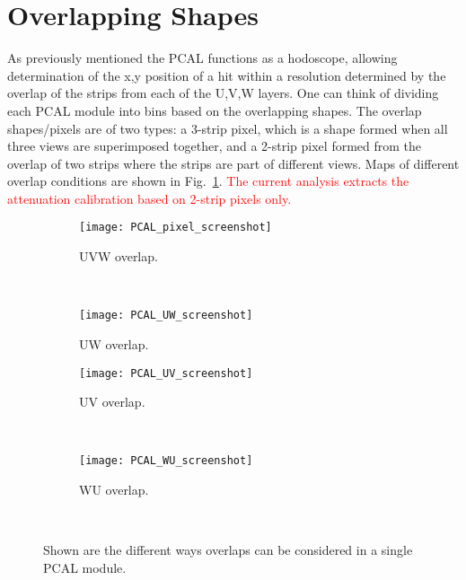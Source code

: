 
\section{Overlapping Shapes}
As previously mentioned the PCAL functions as a hodoscope, allowing determination of the x,y position of a hit within a resolution determined by the overlap of the strips from each of the U,V,W layers.  One can think of dividing each PCAL module into bins based on the 
overlapping shapes. The overlap shapes/pixels are of two types: a 3-strip pixel, which is a shape formed when all three views are superimposed together, and a 2-strip pixel formed from the overlap of two strips where the strips are
part of different views.  Maps of different overlap conditions are shown in Fig.~\ref{fig:PCAL_overlap}.
\textcolor{red}{The current analysis extracts the attenuation calibration based on 2-strip pixels only.}


\begin{figure}[h]
  \centering
  \begin{subfigure}[b]{0.45\textwidth}
  \texttt{[image: PCAL\_pixel\_screenshot]}
  \caption{UVW overlap.}
  \end{subfigure}
  ~
  \begin{subfigure}[b]{0.45\textwidth}
  \texttt{[image: PCAL\_UW\_screenshot]}
  \caption{UW overlap.}
  \end{subfigure}

  \begin{subfigure}[b]{0.45\textwidth}
  \texttt{[image: PCAL\_UV\_screenshot]}
  \caption{UV overlap.}
 \end{subfigure}
  ~
  \begin{subfigure}[b]{0.45\textwidth}
  \texttt{[image: PCAL\_WU\_screenshot]}
  \caption{WU overlap.}
  \end{subfigure}
  ~
  \caption{Shown are the different ways overlaps can be considered in a single PCAL module.}
  \label{fig:PCAL_overlap}
\end{figure}
\FloatBarrier


